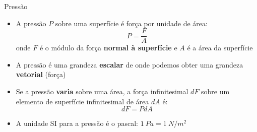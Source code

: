 \documentclass[t,%
brazilian,%
11pt,%
aspectratio=169,%
table%
]{beamer}
\begin{document}
\begin{frame}{Pressão}

    \begin{itemize}
        \item A pressão $P$ sobre uma superfície é força por unidade de área:
            \[
                P=\frac{F}{A}
            \]
            onde $F$ é o módulo da força \textbf{normal à superfície} e $A$ é a área da superfície
        \item A pressão é uma grandeza \textbf{escalar} de onde podemos obter uma grandeza \textbf{vetorial} (força)

        \item Se a pressão \textbf{varia} sobre uma área, a força infinitesimal
            $dF$ sobre um elemento de superfície infinitesimal de área $dA$ é:
            \[
                dF=P dA
            \]
        \item A unidade SI para a pressão é o pascal: $\SI{1}{Pa} = \SI{1}{N/m^2}$
    \end{itemize}
\end{frame}
\end{document}
